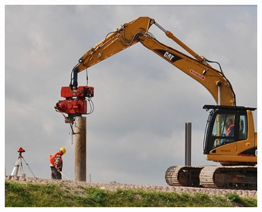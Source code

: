 \documentclass[10pt, pdf, hyperref={unicode}]{beamer}
\begin{document}
\begin{frame}
\begin{center}
\begin{minipage}[h]{0.97\linewidth}
\begin{minipage}[h]{0.29\linewidth}
\begin{figure}[h]
                        \includegraphics[width=1\linewidth]{../img/photo_3.jpg}
                    \end{figure}
                \end{minipage}
            \end{minipage}
        \end{center}
    \end{frame}
\end{document}
